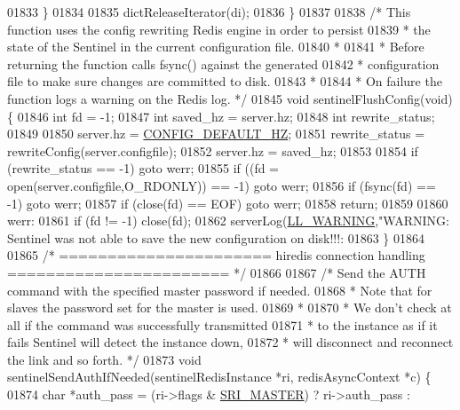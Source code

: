 \begin{DoxyCode}
{{{{{{{{{{{{{{{{{{{{{{{{{{{{{{{{01833     \}
01834 
01835     dictReleaseIterator(di);
01836 \}
01837 
01838 \textcolor{comment}{/* This function uses the config rewriting Redis engine in order to persist}
01839 \textcolor{comment}{ * the state of the Sentinel in the current configuration file.}
01840 \textcolor{comment}{ *}
01841 \textcolor{comment}{ * Before returning the function calls fsync() against the generated}
01842 \textcolor{comment}{ * configuration file to make sure changes are committed to disk.}
01843 \textcolor{comment}{ *}
01844 \textcolor{comment}{ * On failure the function logs a warning on the Redis log. */}
01845 \textcolor{keywordtype}{void} sentinelFlushConfig(\textcolor{keywordtype}{void}) \{
01846     \textcolor{keywordtype}{int} fd = -1;
01847     \textcolor{keywordtype}{int} saved\_hz = server.hz;
01848     \textcolor{keywordtype}{int} rewrite\_status;
01849 
01850     server.hz = \hyperlink{server_8h_aa5a3b127e21d6bf089025d953c44678a}{CONFIG\_DEFAULT\_HZ};
01851     rewrite\_status = rewriteConfig(server.configfile);
01852     server.hz = saved\_hz;
01853 
01854     \textcolor{keywordflow}{if} (rewrite\_status == -1) \textcolor{keywordflow}{goto} werr;
01855     \textcolor{keywordflow}{if} ((fd = open(server.configfile,O\_RDONLY)) == -1) \textcolor{keywordflow}{goto} werr;
01856     \textcolor{keywordflow}{if} (fsync(fd) == -1) \textcolor{keywordflow}{goto} werr;
01857     \textcolor{keywordflow}{if} (close(fd) == EOF) \textcolor{keywordflow}{goto} werr;
01858     \textcolor{keywordflow}{return};
01859 
01860 werr:
01861     \textcolor{keywordflow}{if} (fd != -1) close(fd);
01862     serverLog(\hyperlink{server_8h_a31229b9334bba7d6be2a72970967a14b}{LL\_WARNING},\textcolor{stringliteral}{"WARNING: Sentinel was not able to save the new configuration on
       disk!!!: %
01863 \}
01864 
01865 \textcolor{comment}{/* ====================== hiredis connection handling ======================= */}
01866 
01867 \textcolor{comment}{/* Send the AUTH command with the specified master password if needed.}
01868 \textcolor{comment}{ * Note that for slaves the password set for the master is used.}
01869 \textcolor{comment}{ *}
01870 \textcolor{comment}{ * We don't check at all if the command was successfully transmitted}
01871 \textcolor{comment}{ * to the instance as if it fails Sentinel will detect the instance down,}
01872 \textcolor{comment}{ * will disconnect and reconnect the link and so forth. */}
01873 \textcolor{keywordtype}{void} sentinelSendAuthIfNeeded(sentinelRedisInstance *ri, redisAsyncContext *c) \{
01874     \textcolor{keywordtype}{char} *auth\_pass = (ri->flags & \hyperlink{sentinel_8c_a2ee83e5ff67b45746cd6a310f15334b2}{SRI\_MASTER}) ? ri->auth\_pass :
}}}}}}}}}}}}}}}}}}}}}}}}}}}}}}}}}
\end{DoxyCode}
